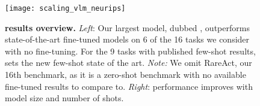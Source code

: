 \newcommand{\expect}[2]{\mathds{E}_{{#1}} \left[ {#2} \right]}
\newcommand{\myvec}[1]{\boldsymbol{#1}}
\newcommand{\myvecsym}[1]{\boldsymbol{#1}}
\newcommand{\vx}{\myvec{x}}
\newcommand{\vy}{\myvec{y}}
\newcommand{\vz}{\myvec{z}}
\newcommand{\vtheta}{\myvecsym{\theta}}
\newcommand{\videotextpairs}{Video \& Text Pairs}
\newcommand{\shortvideotextpairs}{VTP}
\newcommand{\imagetextpairs}{Long Text \& Image Pairs}
\newcommand{\shortimagetextpairs}{LTIP}
\newcommand{\shortmmw}{M3W}

\newcommand{\dev}{\textsc{dev}}
\newcommand{\standard}{\textsc{hidden}}
\newcommand{\offbeat}{\textsc{offbeat}}
\newcommand{\devmultibenchmark}{\dev~multi-benchmark}
\newcommand{\standardmultibenchmark}{\standard~multi-benchmark}
\newcommand{\offbeatmultibenchmark}{\offbeat~multi-benchmark}

\newcommand{\metadevquery}{\emph{validation query} subset}
\newcommand{\metadevsupport}{\emph{validation support} subset}
\newcommand{\metadevsubsets}{\emph{validation} subsets}
\newcommand{\metatestquery}{\emph{test query} subset}
\newcommand{\metatestsupport}{\emph{test support} subset}


\newcommand{\metadevqueryshort}{\emph{validation query}}
\newcommand{\metadevsupportshort}{\emph{validation support}}
\newcommand{\metadevsubsetsshort}{\emph{validation} subsets}
\newcommand{\metatestqueryshort}{\emph{test query}}
\newcommand{\metatestsupportshort}{\emph{test support}}


\newcommand{\newreferencetoappendix}[1]{#1}

\newcommand{\maintoappref}[1]{\ifwithappendix\ref{#1}\else\ref*{#1}\fi}

\newcommand{\ifNewIntro}[2]{#1}  %






\begin{figure}
    \centering
    \texttt{[image: scaling\_vlm\_neurips]}
    \caption{\capfontsize{} \textbf{\method{} results overview.} \textit{Left}: Our largest model, dubbed \largem{}, outperforms state-of-the-art fine-tuned models on 6 of the 16 tasks we consider
    with no fine-tuning.
    For the 9 tasks with published few-shot results,
    \largem{} sets the new few-shot state of the art.
    \emph{Note:} We omit RareAct, our 16th benchmark, as it is a zero-shot benchmark with no available fine-tuned results to compare to.
    \textit{Right}: \method{} performance improves with model size and number of shots.
    \vspace*{-0.4cm}
    }
    \label{fig:results}
\end{figure}


